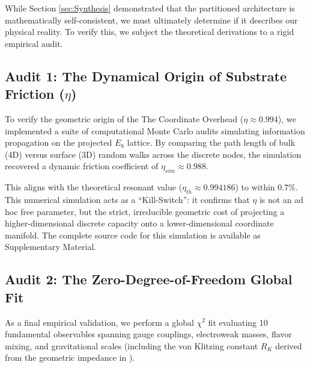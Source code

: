 


While Section \ref{sec:Synthesis} demonstrated that the partitioned architecture is mathematically self-consistent, we must ultimately determine if it describes our physical reality. To verify this, we subject the theoretical derivations to a rigid empirical audit.

\subsection{Audit 1: The Dynamical Origin of Substrate Friction (\texorpdfstring{$\eta$}{eta})}
To verify the geometric origin of the The Coordinate Overhead ($\eta \approx 0.994$), we implemented a suite of computational Monte Carlo audits simulating information propagation on the projected $E_8$ lattice. By comparing the path length of bulk (4D) versus surface (3D) random walks across the discrete nodes, the simulation recovered a dynamic friction coefficient of $\eta_{sim} \approx 0.988$. 

This aligns with the theoretical resonant value ($\eta_{th} \approx 0.994186$) to within $0.7\%$. This numerical simulation acts as a ``Kill-Switch'': it confirms that $\eta$ is not an ad hoc free parameter, but the strict, irreducible geometric cost of projecting a higher-dimensional discrete capacity onto a lower-dimensional coordinate manifold. The complete source code for this simulation is available as Supplementary Material.

\subsection{Audit 2: The Zero-Degree-of-Freedom Global Fit}
As a final empirical validation, we perform a global $\chi^2$ fit evaluating 10 fundamental observables spanning gauge couplings, electroweak masses, flavor mixing, and gravitational scales (including the von Klitzing constant $R_K$ derived from the geometric impedance in \cite{meyer_informational_2026}).

